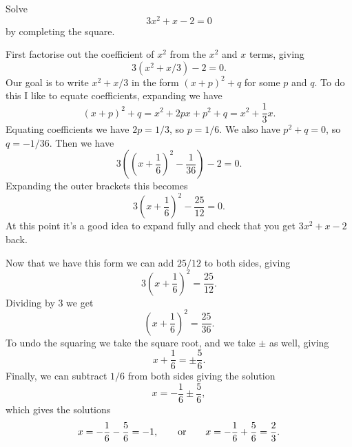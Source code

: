 \documentclass[fleqn]{LectureClass/LectureClass}
\begin{document}
    \begin{exm}{}{}
        Solve
        \begin{equation}
            3x^2 + x - 2 = 0
        \end{equation}
        by completing the square.
        
        First factorise out the coefficient of \(x^2\) from the \(x^2\) and \(x\) terms, giving
        \begin{equation}
            3(x^2 + x/3) - 2 = 0.
        \end{equation}
        Our goal is to write \(x^2 + x/3\) in the form \((x + p)^2 + q\) for some \(p\) and \(q\).
        To do this I like to equate coefficients, expanding we have
        \begin{equation}
            (x + p)^2 + q = x^2 + 2px + p^2 + q = x^2 + \frac{1}{3}x.
        \end{equation}
        Equating coefficients we have \(2p = 1/3\), so \(p = 1/6\).
        We also have \(p^2 + q = 0\), so \(q = -1/36\).
        Then we have
        \begin{equation}
            3\left( \left( x + \frac{1}{6} \right)^2 - \frac{1}{36} \right) - 2 = 0.
        \end{equation}
        Expanding the outer brackets this becomes
        \begin{equation}
            3\left( x + \frac{1}{6} \right)^2 - \frac{25}{12} = 0.
        \end{equation}
        At this point it's a good idea to expand fully and check that you get \(3x^2 + x - 2\) back.
        
        Now that we have this form we can add \(25/12\) to both sides, giving
        \begin{equation}
            3\left( x + \frac{1}{6} \right)^2 = \frac{25}{12}.
        \end{equation}
        Dividing by \(3\) we get
        \begin{equation}
            \left( x + \frac{1}{6} \right)^2 = \frac{25}{36}.
        \end{equation}
        To undo the squaring we take the square root, and we take \(\pm\) as well, giving
        \begin{equation}
            x + \frac{1}{6} = \pm \frac{5}{6}.
        \end{equation}
        Finally, we can subtract \(1/6\) from both sides giving the solution
        \begin{equation}
            x = -\frac{1}{6} \pm \frac{5}{6},
        \end{equation}
        which gives the solutions
        \begin{equation}
            x = -\frac{1}{6} - \frac{5}{6} = -1, \qquad\text{or}\qquad x = -\frac{1}{6} + \frac{5}{6} = \frac{2}{3}.
        \end{equation}
    \end{exm}
    
\end{document}
